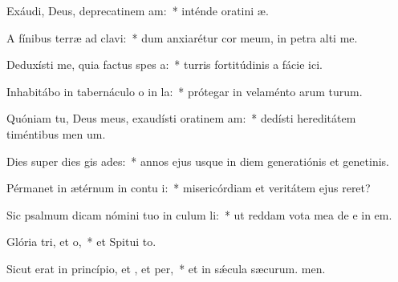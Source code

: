 \item Exáudi, Deus, deprecatinem am:~* inténde oratini æ.
\item A fínibus terræ ad  clavi:~* dum anxiarétur cor meum, in petra alti me.
\item Deduxísti me, quia factus  spes a:~* turris fortitúdinis a fácie ici.
\item Inhabitábo in tabernáculo o in la:~* prótegar in velaménto arum turum.
\item Quóniam tu, Deus meus, exaudísti oratinem am:~* dedísti hereditátem timéntibus men um.
\item Dies super dies gis ades:~* annos ejus usque in diem generatiónis et genetinis.
\item Pérmanet in ætérnum in contu i:~* misericórdiam et veritátem ejus  reret?
\item Sic psalmum dicam nómini tuo in culum li:~* ut reddam vota mea de e in em.
\item Glória tri, et o,~* et Spitui to.
\item Sicut erat in princípio, et , et per,~* et in sǽcula sæcurum. men.
